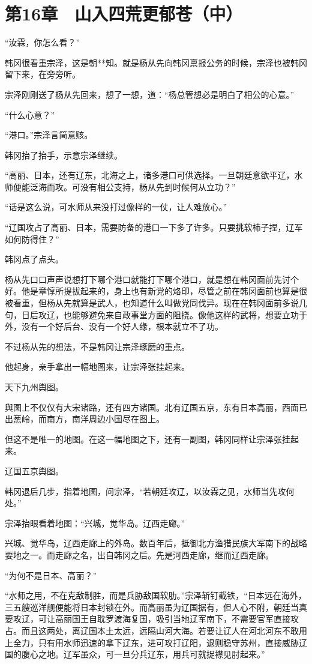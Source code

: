 \section{第16章　山入四荒更郁苍（中）}

“汝霖，你怎么看？”

韩冈很看重宗泽，这是朝**知。就是杨从先向韩冈禀报公务的时候，宗泽也被韩冈留下来，在旁旁听。

宗泽刚刚送了杨从先回来，想了一想，道：“杨总管想必是明白了相公的心意。”

“什么心意？”

“港口。”宗泽言简意赅。

韩冈抬了抬手，示意宗泽继续。

“高丽、日本，还有辽东，北海之上，诸多港口可供选择。一旦朝廷意欲平辽，水师便能泛海而攻。可没有相公支持，杨从先到时候何从立功？”

“话是这么说，可水师从来没打过像样的一仗，让人难放心。”

“辽国攻占了高丽、日本，需要防备的港口一下多了许多。只要挑软柿子捏，辽军如何防得住？”

韩冈点了点头。

杨从先口口声声说想打下哪个港口就能打下哪个港口，就是想在韩冈面前先讨个好。他是章惇所提拔起来的，身上也有新党的烙印，尽管之前在韩冈面前也算是很被看重，但杨从先就算是武人，也知道什么叫做党同伐异。现在在韩冈面前多说几句，日后攻辽，也能够避免来自政事堂方面的阻挠。像他这样的武将，想要立功于外，没有一个好后台、没有一个好人缘，根本就立不了功。

不过杨从先的想法，不是韩冈让宗泽琢磨的重点。

他起身，亲手拿出一幅地图来，让宗泽张挂起来。

天下九州舆图。

舆图上不仅仅有大宋诸路，还有四方诸国。北有辽国五京，东有日本高丽，西面已出葱岭，而南方，南洋周边小国尽在图上。

但这不是唯一的地图。在这一幅地图之下，还有一副图，韩冈同样让宗泽张挂起来。

辽国五京舆图。

韩冈退后几步，指着地图，问宗泽，“若朝廷攻辽，以汝霖之见，水师当先攻何处。”

宗泽抬眼看着地图：“兴城，觉华岛。辽西走廊。”

兴城、觉华岛，辽西走廊上的外岛。数百年后，抵御北方渔猎民族大军南下的战略要地之一。而走廊之名，出自韩冈之后。先是河西走廊，继而辽西走廊。

“为何不是日本、高丽？”

“水师之用，不在克敌制胜，而是兵胁敌国软肋。”宗泽斩钉截铁，“日本远在海外，三五艘巡洋舰便能将日本封锁在外。而高丽虽为辽国据有，但人心不附，朝廷当真要攻辽，可让高丽国王自耽罗渡海复国，吸引当地辽军南下，不需要官军直接攻占。而且这两处，离辽国本土太远，远隔山河大海。若要让辽人在河北河东不敢用上全力，只有用水师迅速的拿下辽东，进可攻打辽阳，退则稳守苏州，直接威胁辽国的腹心之地。辽军虽众，可一旦分兵辽东，用兵可就捉襟见肘起来。”

